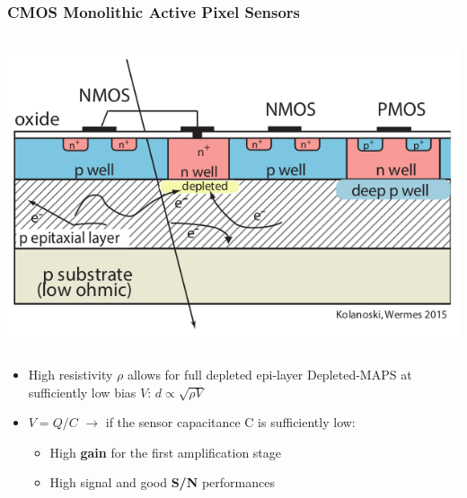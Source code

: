     \begin{frame}
        \frametitle{CMOS Monolithic Active Pixel Sensors}
        \begin{columns}
                \vspace*{-0.5cm}
                \hspace*{+1.2cm}
                \includegraphics[width=0.9\linewidth]{figures/Pixel_detectors/MAPS_scheme.png}
            \end{columns}   
        \medskip         
        \begin{itemize}
            \item High resistivity $\rho$ allows for full depleted epi-layer Depleted-MAPS at sufficiently low bias $V$: 
             $d \propto \sqrt{\rho V}$
            \item $V = Q/C$ $\rightarrow$ if the sensor capacitance C is sufficiently low:
            \begin{itemize}
                \item High \textbf{gain} for the first amplification stage
                \item High signal and good \textbf{S/N} performances  

\end{itemize}
\end{itemize}
\end{frame}
